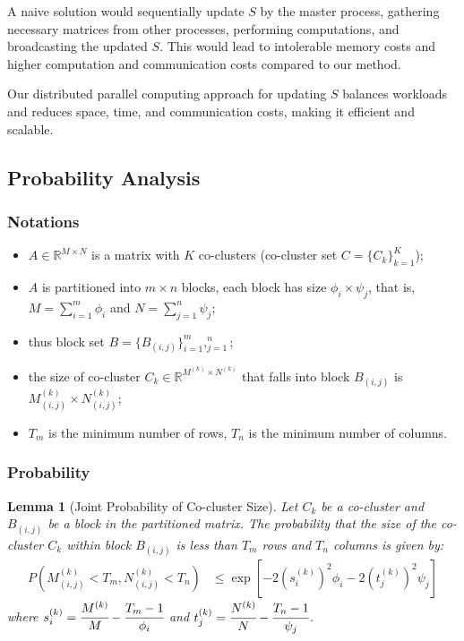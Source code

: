 \documentclass[journal]{IEEEtran}
\newtheorem{lemma}{Lemma}
\begin{document}
A naive solution would sequentially update $S$ by the master process, gathering necessary matrices from other processes, performing computations, and broadcasting the updated $S$. This would lead to intolerable memory costs and higher computation and communication costs compared to our method.

Our distributed parallel computing approach for updating $S$ balances workloads and reduces space, time, and communication costs, making it efficient and scalable.
\subsection{Probability Analysis}

\subsubsection{Notations}
\label{subsec:probability}
\begin{itemize}
  \item $A \in \mathbb{R}^{M \times N}$ is a matrix with $K$ co-clusters (co-cluster set $C = \{C_k\}_{k=1}^K$);
  \item $A$ is partitioned into $m \times n$ blocks, each block has size $\phi_i \times \psi_j$, that is, $M=\sum_{i=1}^m \phi_i$ and $N=\sum_{j=1}^n \psi_j$;
  \item thus block set $B = \{B_{(i,j)}\}_{i=1}^m,_{j=1}^n$;
  \item the size of co-cluster $C_k \in \mathbb{R}^{M^{(k)} \times N^{(k)}}$ that falls into block $B_{(i,j)}$ is $M_{(i,j)}^{(k)} \times N_{(i,j)}^{(k)}$;
  \item $T_m$ is the minimum number of rows, $T_n$ is the minimum number of columns.
\end{itemize}

\subsubsection{Probability}

\begin{lemma}[Joint Probability of Co-cluster Size]
  \label{thm:joint_probability}
  Let $C_k$ be a co-cluster and $B_{(i,j)}$ be a block in the partitioned matrix. The probability that the size of the co-cluster $C_k$ within block $B_{(i,j)}$ is less than $T_m$ rows and $T_n$ columns is given by:
  \begin{align*}
    P(M_{(i,j)}^{(k)} < T_m, N_{(i,j)}^{(k)} < T_n) & \le \exp[-2 (s_i^{(k)})^2 \phi_i -2 (t_j^{(k)})^2 \psi_j]
  \end{align*}
  where $s_i^{(k)} = \cfrac{M^{(k)}}{M}-\cfrac{T_m-1}{\phi_i}$ and $t_j^{(k)} = \cfrac{N^{(k)}}{N}-\cfrac{T_n-1}{\psi_j}$.
\end{lemma}
\end{document}
